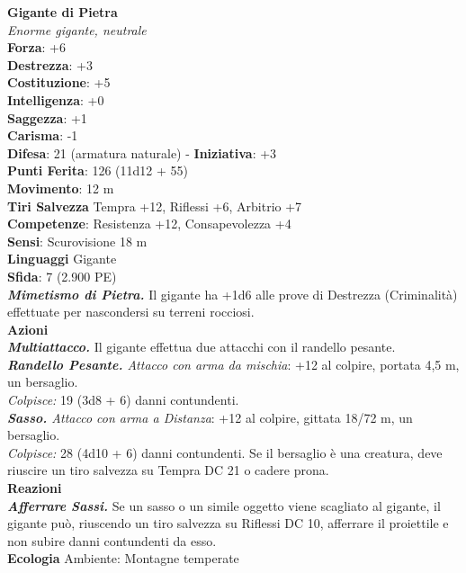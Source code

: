 \begin{multicols}{2}
\medskip\textbf{Gigante di Pietra}\\
\emph{Enorme gigante, neutrale}\\
\textbf{Forza}: +6\\
\textbf{Destrezza}: +3\\
\textbf{Costituzione}: +5\\
\textbf{Intelligenza}: +0\\
\textbf{Saggezza}: +1\\
\textbf{Carisma}: -1\\
\textbf{Difesa}: 21 (armatura naturale) - \textbf{Iniziativa}: +3\\
\textbf{Punti Ferita}: 126 (11d12 + 55)\\
\textbf{Movimento}: 12 m\\
\textbf{Tiri Salvezza} Tempra +12, Riflessi +6, Arbitrio +7\\
\textbf{Competenze}: Resistenza +12, Consapevolezza +4\\
\textbf{Sensi}: Scurovisione 18 m\\
\textbf{Linguaggi} Gigante\\
\textbf{Sfida}: 7 (2.900 PE)\smallskip\\
\emph{\textbf{Mimetismo di Pietra.}} Il gigante ha +1d6 alle prove di Destrezza (Criminalità) effettuate per nascondersi su terreni rocciosi.\\
\smallskip\textbf{Azioni}\\
\emph{\textbf{Multiattacco.}} Il gigante effettua due attacchi con il randello pesante.\\
\emph{\textbf{Randello Pesante.} Attacco con arma da mischia}: +12 al colpire, portata 4,5 m, un bersaglio.\\
\emph{Colpisce:} 19 (3d8 + 6) danni contundenti.\\
\emph{\textbf{Sasso.} Attacco con arma a Distanza}: +12 al colpire, gittata 18/72 m, un bersaglio.\\
\emph{Colpisce:} 28 (4d10 + 6) danni contundenti. Se il bersaglio è una creatura, deve riuscire un tiro salvezza su Tempra DC  21 o cadere prona.\\
\textbf{Reazioni}\\
\emph{\textbf{Afferrare Sassi.}} Se un sasso o un simile oggetto viene scagliato al gigante, il gigante può, riuscendo un tiro salvezza su Riflessi DC 10, afferrare il proiettile e non subire danni contundenti da esso.\\
\textbf{Ecologia}
Ambiente: Montagne temperate\\

\end{multicols}
